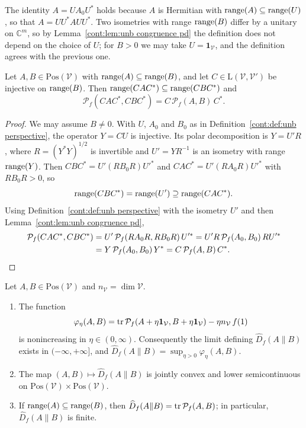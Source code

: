The identity $A=UA_0U^*$ holds because $A$ is Hermitian with $\operatorname{range}(A)\subseteq\operatorname{range}(U)$, so that $A=UU^*AUU^*$. Two isometries with range $\operatorname{range}(B)$ differ by a unitary on $\mathbb{C}^m$, so by Lemma~\ref{cont:lem:unb congruence pd} the definition does not depend on the choice of $U$; for $B>0$ we may take $U=\mathbf{1}_{\mathcal{V}}$, and the definition agrees with the previous one.

\begin{lemma}\label{cont:lem:unb congruence}
Let $A,B\in\mathrm{Pos}(\mathcal{V})$ with $\operatorname{range}(A)\subseteq\operatorname{range}(B)$, and let $C\in\mathrm{L}(\mathcal{V},\mathcal{V}')$ be injective on $\operatorname{range}(B)$. Then $\operatorname{range}(CAC^*)\subseteq\operatorname{range}(CBC^*)$ and
\[
\mathcal{P}_f(CAC^*,CBC^*)=C\,\mathcal{P}_f(A,B)\,C^*.
\]
\end{lemma}

\begin{proof}
We may assume $B\neq0$. With $U$, $A_0$ and $B_0$ as in Definition~\ref{cont:def:unb perspective}, the operator $Y=CU$ is injective. Its polar decomposition is $Y=U'R$, where $R=(Y^*Y)^{1/2}$ is invertible and $U'=YR^{-1}$ is an isometry with range $\operatorname{range}(Y)$. Then $CBC^*=U'(RB_0R)U'^*$ and $CAC^*=U'(RA_0R)U'^*$ with $RB_0R>0$, so
\[
\operatorname{range}(CBC^*)=\operatorname{range}(U')\supseteq\operatorname{range}(CAC^*).
\]
Using Definition~\ref{cont:def:unb perspective} with the isometry $U'$ and then Lemma~\ref{cont:lem:unb congruence pd},
\begin{align*}
\mathcal{P}_f(CAC^*,CBC^*)&=U'\,\mathcal{P}_f(RA_0R,RB_0R)\,U'^*=U'R\,\mathcal{P}_f(A_0,B_0)\,RU'^*\\
&=Y\,\mathcal{P}_f(A_0,B_0)\,Y^*=C\,\mathcal{P}_f(A,B)\,C^*.\qedhere
\end{align*}
\end{proof}

\begin{lemma}\label{cont:lem:unb basic}
Let $A,B\in\mathrm{Pos}(\mathcal{V})$ and $n_{\mathcal{V}}=\dim\mathcal{V}$.
\begin{enumerate}
\item The function
\[
\varphi_\eta(A,B)=\operatorname{tr}\mathcal{P}_f(A+\eta\mathbf{1}_{\mathcal{V}},B+\eta\mathbf{1}_{\mathcal{V}})-\eta n_{\mathcal{V}}\,f(1)
\]
is nonincreasing in $\eta\in(0,\infty)$. Consequently the limit defining $\widehat{D}_f(A\|B)$ exists in $(-\infty,+\infty]$, and $\widehat{D}_f(A\|B)=\sup_{\eta>0}\varphi_\eta(A,B)$.
\item The map $(A,B)\mapsto\widehat{D}_f(A\|B)$ is jointly convex and lower semicontinuous on $\mathrm{Pos}(\mathcal{V})\times\mathrm{Pos}(\mathcal{V})$.
\item If $\operatorname{range}(A)\subseteq\operatorname{range}(B)$, then $\widehat{D}_f(A\|B)=\operatorname{tr}\mathcal{P}_f(A,B)$; in particular, $\widehat{D}_f(A\|B)$ is finite.
\end{enumerate}
\end{lemma}

